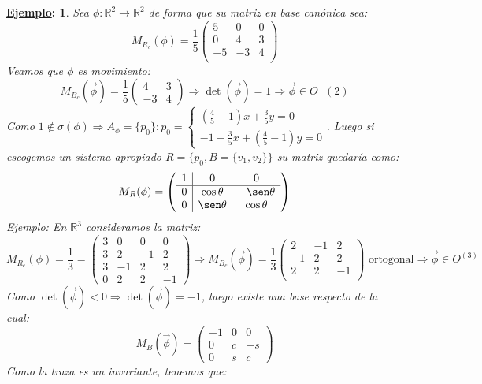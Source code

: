 \documentclass[10pt,a4paper,openright]{book}
\theoremstyle{break}
\newtheorem*{ej}{\underline{Ejemplo}:}
\begin{document}
\begin{ej}
Sea $\phi: \mathbb{R}^2 \to \mathbb{R}^2$ de forma que su matriz en base canónica sea:
$$M_{R_c} (\phi) = \frac{1}{5} \begin{pmatrix} 5 & 0 & 0 \\ 0 & 4 & 3 \\ -5 & -3 & 4 \\\end{pmatrix} $$
Veamos que $\phi$ es movimiento:
$$M_{B_c} (\vec{\phi}) = \frac{1}{5} \begin{pmatrix}
4 & 3 \\ -3 & 4
\end{pmatrix} \Rightarrow \det(\vec{\phi}) = 1 \Rightarrow \vec{\phi} \in O^+ (2)$$
Como $1 \notin \sigma(\phi) \Rightarrow A_\phi = \{p_0\} : p_0 = \begin{cases} (\frac{4}{5} - 1) x + \frac{3}{5} y = 0 \\ -1 - \frac{3}{5} x + (\frac{4}{5} - 1) y = 0\end{cases}$. Luego si escogemos un sistema apropiado $R = \{p_0, B = \{v_1, v_2\}\}$ su matriz quedaría como:
$$M_R (\phi) = \left(\begin{array}{c|cc}
1& 0  & 0 \\
\hline
0 & \cos\theta & -\sen\theta    \\
0 & \sen\theta & \cos\theta 
\end{array}
\right)$$
Ejemplo: En $\mathbb{R}^3$ consideramos la matriz:
$$M_{R_c} (\phi) = \frac{1}{3} =
\left(\begin{array}{c|ccc}
3 & 0  & 0 & 0 \\
\hline
3 & 2 & -1 & 2    \\
3 & -1 & 2 & 2 \\
0 & 2 & 2 & -1 
\end{array}
\right) \Rightarrow M_{B_c} (\vec{\phi}) = \frac{1}{3} \begin{pmatrix} 2 & -1 & 2 \\ -1 & 2 & 2 \\ 2 & 2 & -1 \\\end{pmatrix} \mbox{ ortogonal}\Rightarrow \vec{\phi} \in O^(3)$$
Como $\det (\vec{\phi}) < 0 \Rightarrow \det(\vec{\phi}) = -1$, luego existe una base respecto de la cual:
$$M_B(\vec{\phi})=\begin{pmatrix} -1 & 0 & 0 \\ 0 & c & -s \\ 0 & s & c\end{pmatrix}$$
Como la traza es un invariante, tenemos que:

\end{ej}
\end{document}
